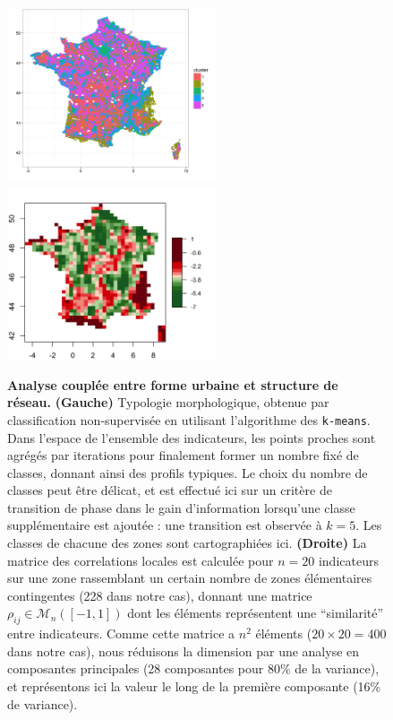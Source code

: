 \begin{figure}%
\hspace{-1cm}
\includegraphics[width=0.55\textwidth]{figures/morpho_cluster_map_k5_full}
\includegraphics[width=0.55\textwidth]{figures/morpho_corr_PCA_rhoasize12}
\caption{\textbf{Analyse couplée entre forme urbaine et structure de réseau.} \textbf{(Gauche)} Typologie morphologique, obtenue par classification non-supervisée en utilisant l'algorithme des \texttt{k-means}. Dans l'espace de l'ensemble des indicateurs, les points proches sont agrégés par iterations pour finalement former un nombre fixé de classes, donnant ainsi des profils typiques. Le choix du nombre de classes peut être délicat, et est effectué ici sur un critère de transition de phase dans le gain d'information lorsqu'une classe supplémentaire est ajoutée : une transition est observée à $k=5$. Les classes de chacune des zones sont cartographiées ici. \textbf{(Droite)} La matrice des correlations locales est calculée pour $n=20$ indicateurs sur une zone rassemblant un certain nombre de zones élémentaires contingentes (228 dans notre cas), donnant une matrice $\rho_{ij}\in \mathcal{M}_n(\left[-1,1\right])$ dont les éléments représentent une ``similarité'' entre indicateurs. Comme cette matrice a $n^2$ éléments ($20\times 20 = 400$ dans notre cas), nous réduisons la dimension par une analyse en composantes principales (28 composantes pour 80\% de la variance), et représentons ici la valeur le long de la première composante (16\% de variance).}
\label{fig:corrs}
\end{figure}



